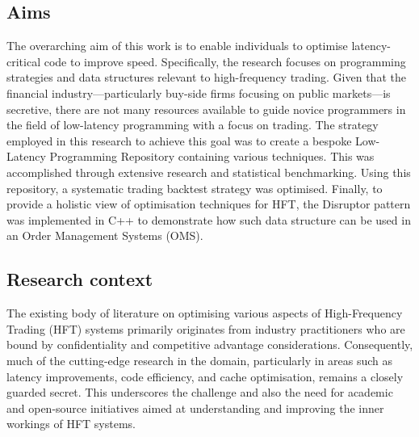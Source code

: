 \documentclass{article}
\theoremstyle{break}
\begin{document}
\subsection{Aims}
The overarching aim of this work is to enable individuals to optimise latency-critical code to improve speed. Specifically, the research focuses on programming strategies and data structures relevant to high-frequency trading. Given that the financial industry—particularly buy-side firms focusing on public markets—is secretive, there are not many resources available to guide novice programmers in the field of low-latency programming with a focus on trading. The strategy employed in this research to achieve this goal was to create a bespoke Low-Latency Programming Repository containing various techniques. This was accomplished through extensive research and statistical benchmarking. Using this repository, a systematic trading backtest strategy was optimised. Finally, to provide a holistic view of optimisation techniques for HFT, the Disruptor pattern was implemented in C++ to demonstrate how such data structure can be used in an Order Management Systems (OMS).


\subsection{Research context}
The existing body of literature on optimising various aspects of High-Frequency Trading (HFT) systems primarily originates from industry practitioners who are bound by confidentiality and competitive advantage considerations. Consequently, much of the cutting-edge research in the domain, particularly in areas such as latency improvements, code efficiency, and cache optimisation, remains a closely guarded secret. This underscores the challenge and also the need for academic and open-source initiatives aimed at understanding and improving the inner workings of HFT systems. 
\end{document}

